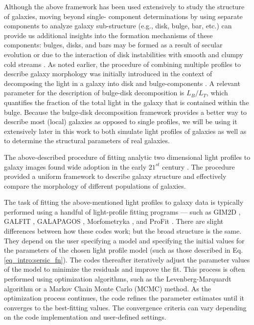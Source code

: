 Although the above framework has been used extensively to study the structure of galaxies, moving beyond single-\sersic{} component determinations by using separate components to analyze galaxy sub-structure (e.g., disk, bulge, bar, etc.) can provide us additional insights into the formation mechanisms of these components: bulges, disks, and bars may be formed as a result of secular evolution \citep[e.g.,][]{kormendy_2004, genzel_2008, sellwood_2014} or due to the interaction of disk instabilities with smooth and clumpy cold streams \citep[e.g.,][]{dekel_09a,dekel_09b}. As noted earlier, the procedure of combining multiple \sersic{} profiles to describe galaxy morphology was initially introduced in the context of decomposing the light in a galaxy into disk and bulge-components \citep{kormendy_1979}. A relevant parameter for the description of bulge-disk decomposition is $L_B/L_T$, which quantifies the fraction of the total light in the galaxy that is contained within the bulge. Because the bulge-disk decomposition framework provides a better way to describe most (local) galaxies as opposed to single \sersic{} profiles, we will be using it extensively later in this work to both simulate light profiles of galaxies as well as to determine the structural parameters of real galaxies.

The above-described procedure of fitting analytic two dimensional light profiles to galaxy images found wide adoption in the early $21^{st}$ century \citep[e.g.,][]{graham_03, kormendy_09, simard_11,vdw_12}. The procedure provided a uniform framework to describe galaxy structure and effectively compare the morphology of different populations of galaxies. 

The task of fitting the above-mentioned light profiles to galaxy data is typically performed using a handful of light-profile fitting programs --- such as GIM2D \citep{gim2d}, GALFIT \citep{galfit}, GALAPAGOS \citep{galapagos}, Morfometryka \citep{morfometryka}, and ProFit \citep{profit}. There are slight differences between how these codes work; but the broad structure is the same. They depend on the user specifying a model and specifying the initial values for the parameters of the chosen light profile model (such as those described in Eq. \ref{eq_intro:sersic_fn}). The codes thereafter iteratively adjust the  parameter values of the model to minimize the residuals and improve the fit. This process is often performed using optimization algorithms, such as the Levenberg-Marquardt algorithm or a Markov Chain Monte Carlo (MCMC) method. As the optimization process continues, the code refines the parameter estimates until it converges to the best-fitting values. The convergence criteria can vary depending on the code implementation and user-defined settings.

